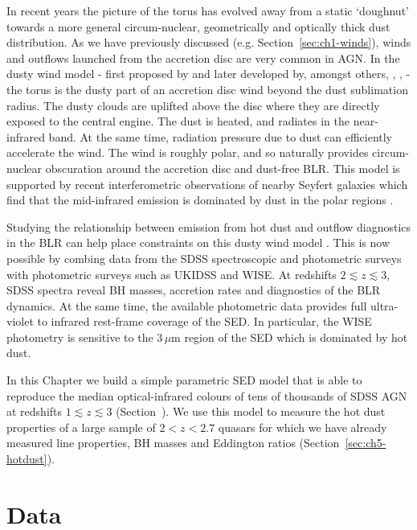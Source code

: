In recent years the picture of the torus has evolved away from a static `doughnut' towards a more general circum-nuclear, geometrically and optically thick dust distribution. 
As we have previously discussed (e.g. Section~\ref{sec:ch1-winds}), winds and outflows launched from the accretion disc are very common in AGN. 
In the dusty wind model - first proposed by \citet{konigl94} and later developed by, amongst others, \citet{everett05}, \citet{elitzur06}, \citet{keating12} - the torus is the dusty part of an accretion disc wind beyond the dust sublimation radius.  
The dusty clouds are uplifted above the disc where they are directly exposed to the central engine. 
The dust is heated, and radiates in the near-infrared band.
At the same time, radiation pressure due to dust can efficiently accelerate the wind. 
The wind is roughly polar, and so naturally provides circum-nuclear obscuration around the accretion disc and dust-free BLR.   
This model is supported by recent interferometric observations of nearby Seyfert galaxies which find that the mid-infrared emission is dominated by dust in the polar regions \citep[e.g.][]{raban09,honig12,honig13,tristram14,lopez-gonzaga16}.

Studying the relationship between emission from hot dust and outflow diagnostics in the BLR can help place constraints on this dusty wind model \citep[e.g.][]{wang13}. 
This is now possible by combing data from the SDSS spectroscopic and photometric surveys with photometric surveys such as UKIDSS and WISE. 
At redshifts $2\lesssim z \lesssim3$, SDSS spectra reveal BH masses, accretion rates and diagnostics of the BLR dynamics. 
At the same time, the available photometric data provides full ultra-violet to infrared rest-frame coverage of the SED.
In particular, the WISE photometry is sensitive to the 3\,$\mu$m region of the SED which is dominated by hot dust. 

In this Chapter we build a simple parametric SED model that is able to reproduce the median optical-infrared colours of tens of thousands of SDSS AGN at redshifts $1 \lesssim z \lesssim 3$ (Section~\label{sec:ch5-standardmodel}).
We use this model to measure the hot dust properties of a large sample of $2 < z < 2.7$ quasars for which we have already measured  line properties, BH masses and Eddington ratios (Section~\ref{sec:ch5-hotdust}).

\section{Data}

